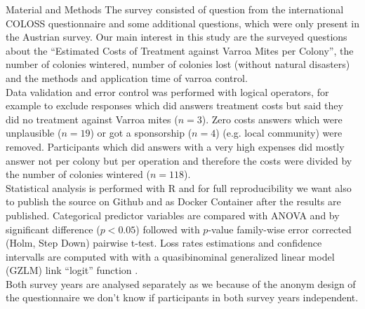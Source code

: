 \documentclass{beamer}
\begin{document}
\begin{frame}{}
\begin{columns}[t]
\begin{column}{0.49\textwidth}
    \begin{block}{Material and Methods}
      The survey consisted of question from the international COLOSS questionnaire and some additional questions, which were only present in the Austrian survey. Our main interest in this study are the surveyed questions about the \enquote{Estimated Costs of Treatment against Varroa Mites per Colony}, the number of colonies wintered, number of colonies lost (without natural disasters) and the methods and application time of varroa control. \\
      Data validation and error control was performed with logical operators, for example to exclude responses which did answers treatment costs but said they did no treatment against Varroa mites ($n=3$). Zero costs answers which were unplausible ($n=19$) or got a sponsorship ($n=4$) (e.g. local community) were removed. Participants which did answers with a very high expenses did mostly answer not per colony but per operation and therefore the costs were divided by the number of colonies wintered ($n=118$). \\
      Statistical analysis is performed with R and for full reproducibility we want also to publish the source on Github and as Docker Container after the results are published. Categorical predictor variables are compared with ANOVA and by significant difference ($p<0.05$) followed with $p$-value family-wise error corrected (Holm, Step Down) pairwise t-test. Loss rates estimations and confidence intervalls are computed with with a quasibinominal generalized linear model (GZLM) link \enquote{logit} function \citep{vanderzee2013}. \\
      Both survey years are analysed separately as we because of the anonym design of the questionnaire we don't know if participants in both survey years independent.
    \end{block}


\end{column}
\end{columns}
\end{frame}
\end{document}

